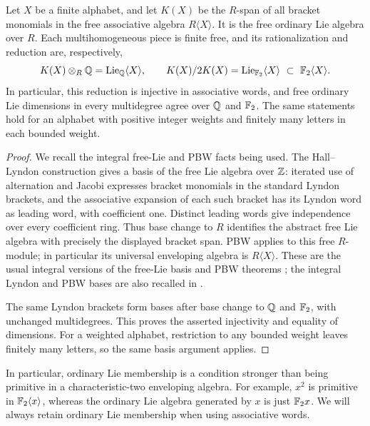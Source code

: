 \begin{samepage}
\begin{lemma}\label{lem:lie-lattice}
Let \(X\) be a finite alphabet, and let \(K(X)\) be the \(R\)-span of
all bracket monomials in the free associative algebra
\(R\langle X\rangle\).  It is the free ordinary Lie algebra over \(R\).
Each multihomogeneous piece is finite free, and its rationalization and
reduction are, respectively,
\[
 K(X)\otimes_R\mathbb Q=\operatorname{Lie}_{\mathbb Q}\langle X\rangle,
 \qquad
 K(X)/2K(X)=\operatorname{Lie}_{{\mathbb F_2}}\langle X\rangle
       \ \subset\ {\mathbb F_2}\langle X\rangle.
\]
In particular, this reduction is injective in associative words, and
free ordinary Lie dimensions in every multidegree agree over \(\mathbb Q\)
and \({\mathbb F_2}\).  The same statements hold for an alphabet with positive
integer weights and finitely many letters in each bounded weight.
\end{lemma}
\end{samepage}
\begin{proof}
We recall the integral free-Lie and PBW facts being used.  The
Hall--Lyndon construction gives a basis of the free Lie algebra over
\(\mathbb Z\): iterated use of alternation and Jacobi expresses bracket
monomials in the standard Lyndon brackets, and the associative
expansion of each such bracket has its Lyndon word as leading word,
with coefficient one.  Distinct leading words give independence over
every coefficient ring.  Thus base change to \(R\) identifies the
abstract free Lie algebra with precisely the displayed bracket span.
PBW applies to this free \(R\)-module; in particular its universal
enveloping algebra is \(R\langle X\rangle\).  These are the usual
integral versions of the free-Lie basis and PBW theorems
\cite[Theorems~0.2, 0.5, 4.9 and~5.1]{Reutenauer};
the integral Lyndon and PBW bases are also recalled in
\cite[Section~2]{MelanconReutenauer}.

The same Lyndon brackets form bases after base change to $\mathbb Q$ and
${\mathbb F_2}$, with unchanged multidegrees.  This proves the asserted
injectivity and equality of dimensions.  For a weighted alphabet,
restriction to any bounded weight leaves finitely many letters,
so the same basis argument applies.
\end{proof}

In particular, ordinary Lie membership is a condition stronger than
being primitive in a characteristic-two enveloping algebra.  For
example, \(x^2\) is primitive in \({\mathbb F_2}\langle x\rangle\), whereas the
ordinary Lie algebra generated by \(x\) is just \({\mathbb F_2} x\).  We will
always retain ordinary Lie membership when using associative words.

